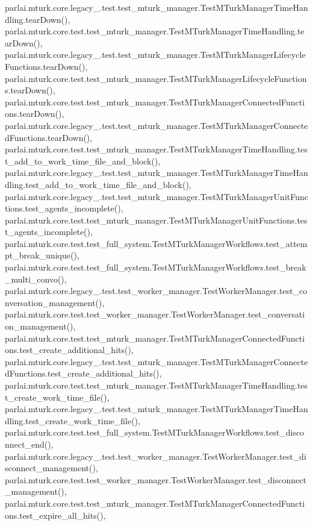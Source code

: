 parlai.\+mturk.\+core.\+legacy\+\_.\+test.\+test\+\_\+mturk\+\_\+manager.\+Test\+M\+Turk\+Manager\+Time\+Handling.\+tear\+Down(), parlai.\+mturk.\+core.\+test.\+test\+\_\+mturk\+\_\+manager.\+Test\+M\+Turk\+Manager\+Time\+Handling.\+tear\+Down(), parlai.\+mturk.\+core.\+legacy\+\_.\+test.\+test\+\_\+mturk\+\_\+manager.\+Test\+M\+Turk\+Manager\+Lifecycle\+Functions.\+tear\+Down(), parlai.\+mturk.\+core.\+test.\+test\+\_\+mturk\+\_\+manager.\+Test\+M\+Turk\+Manager\+Lifecycle\+Functions.\+tear\+Down(), parlai.\+mturk.\+core.\+test.\+test\+\_\+mturk\+\_\+manager.\+Test\+M\+Turk\+Manager\+Connected\+Functions.\+tear\+Down(), parlai.\+mturk.\+core.\+legacy\+\_.\+test.\+test\+\_\+mturk\+\_\+manager.\+Test\+M\+Turk\+Manager\+Connected\+Functions.\+tear\+Down(), parlai.\+mturk.\+core.\+test.\+test\+\_\+mturk\+\_\+manager.\+Test\+M\+Turk\+Manager\+Time\+Handling.\+test\+\_\+add\+\_\+to\+\_\+work\+\_\+time\+\_\+file\+\_\+and\+\_\+block(), parlai.\+mturk.\+core.\+legacy\+\_.\+test.\+test\+\_\+mturk\+\_\+manager.\+Test\+M\+Turk\+Manager\+Time\+Handling.\+test\+\_\+add\+\_\+to\+\_\+work\+\_\+time\+\_\+file\+\_\+and\+\_\+block(), parlai.\+mturk.\+core.\+legacy\+\_.\+test.\+test\+\_\+mturk\+\_\+manager.\+Test\+M\+Turk\+Manager\+Unit\+Functions.\+test\+\_\+agents\+\_\+incomplete(), parlai.\+mturk.\+core.\+test.\+test\+\_\+mturk\+\_\+manager.\+Test\+M\+Turk\+Manager\+Unit\+Functions.\+test\+\_\+agents\+\_\+incomplete(), parlai.\+mturk.\+core.\+test.\+test\+\_\+full\+\_\+system.\+Test\+M\+Turk\+Manager\+Workflows.\+test\+\_\+attempt\+\_\+break\+\_\+unique(), parlai.\+mturk.\+core.\+test.\+test\+\_\+full\+\_\+system.\+Test\+M\+Turk\+Manager\+Workflows.\+test\+\_\+break\+\_\+multi\+\_\+convo(), parlai.\+mturk.\+core.\+legacy\+\_.\+test.\+test\+\_\+worker\+\_\+manager.\+Test\+Worker\+Manager.\+test\+\_\+conversation\+\_\+management(), parlai.\+mturk.\+core.\+test.\+test\+\_\+worker\+\_\+manager.\+Test\+Worker\+Manager.\+test\+\_\+conversation\+\_\+management(), parlai.\+mturk.\+core.\+test.\+test\+\_\+mturk\+\_\+manager.\+Test\+M\+Turk\+Manager\+Connected\+Functions.\+test\+\_\+create\+\_\+additional\+\_\+hits(), parlai.\+mturk.\+core.\+legacy\+\_.\+test.\+test\+\_\+mturk\+\_\+manager.\+Test\+M\+Turk\+Manager\+Connected\+Functions.\+test\+\_\+create\+\_\+additional\+\_\+hits(), parlai.\+mturk.\+core.\+test.\+test\+\_\+mturk\+\_\+manager.\+Test\+M\+Turk\+Manager\+Time\+Handling.\+test\+\_\+create\+\_\+work\+\_\+time\+\_\+file(), parlai.\+mturk.\+core.\+legacy\+\_.\+test.\+test\+\_\+mturk\+\_\+manager.\+Test\+M\+Turk\+Manager\+Time\+Handling.\+test\+\_\+create\+\_\+work\+\_\+time\+\_\+file(), parlai.\+mturk.\+core.\+test.\+test\+\_\+full\+\_\+system.\+Test\+M\+Turk\+Manager\+Workflows.\+test\+\_\+disconnect\+\_\+end(), parlai.\+mturk.\+core.\+legacy\+\_.\+test.\+test\+\_\+worker\+\_\+manager.\+Test\+Worker\+Manager.\+test\+\_\+disconnect\+\_\+management(), parlai.\+mturk.\+core.\+test.\+test\+\_\+worker\+\_\+manager.\+Test\+Worker\+Manager.\+test\+\_\+disconnect\+\_\+management(), parlai.\+mturk.\+core.\+test.\+test\+\_\+mturk\+\_\+manager.\+Test\+M\+Turk\+Manager\+Connected\+Functions.\+test\+\_\+expire\+\_\+all\+\_\+hits(), 